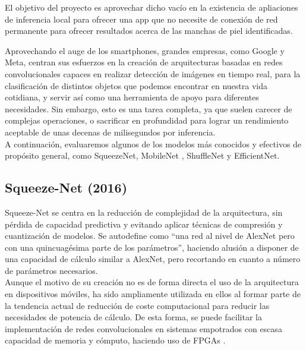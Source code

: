 El objetivo del proyecto es aprovechar dicho vacío en la existencia de apliaciones de inferencia local para ofrecer una app que no necesite de conexión de red permanente para ofrecer resultados acerca de las manchas de piel identificadas.

Aprovechando el auge de los smartphones, grandes empresas, como Google y Meta, centran sus esfuerzos en la creación de arquitecturas basadas en redes convolucionales capaces en realizar detección de imágenes en tiempo real, para la clasificación de distintos objetos que podemos encontrar en nuestra vida cotidiana, y servir así como una herramienta de apoyo para diferentes necesidades. Sin embargo, esto es una tarea completa, ya que suelen carecer de complejas operaciones, o sacrificar en profundidad para lograr un rendimiento aceptable de unas decenas de milisegundos por inferencia.\\

A continuación, evaluaremos algunos de los modelos más conocidos y efectivos de propósito general, como SqueezeNet\cite{iandola2016squeezenet}, MobileNet \cite{howard2017mobilenets}\cite{sandler2019mobilenetv2}\cite{howard2019searching}, ShuffleNet \cite{zhang2017shufflenet} y  EfficientNet\cite{tan2020efficientnet}\cite{eflite}.

\subsection{Squeeze-Net (2016)}

Squeeze-Net\cite{iandola2016squeezenet} se centra en la reducción de complejidad de la arquitectura, sin pérdida de capacidad predictiva y evitando aplicar técnicas de compresión y cuantización\cite{kuzmin2024fp8} de modelos. Se autodefine como ``una red al nivel de AlexNet\cite{NIPS2012_c399862d} pero con una quincuagésima parte de los parámetros'', haciendo alusión a disponer de una capacidad de cálculo similar a AlexNet, pero recortando en cuanto a número de parámetros necesarios.\\

Aunque el motivo de su creación no es de forma directa el uso de la arquitectura en dispositivos móviles, ha sido ampliamente utilizada en ellos al formar parte de la tendencia actual de reducción de coste computacional para reducir las necesidades de potencia de cálculo. De esta forma, se puede facilitar la implementación de redes convolucionales en sistemas empotrados con escasa capacidad de memoria y cómputo, haciendo uso de FPGAs \cite{fpga}.\\

